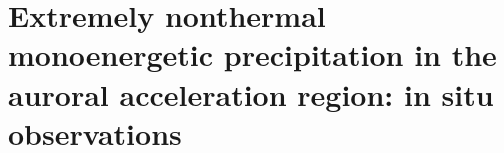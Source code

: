 
\chapter{Extremely nonthermal monoenergetic precipitation in the auroral
  acceleration region: in situ observations}
\label{chp:6}





% 

% 
%


